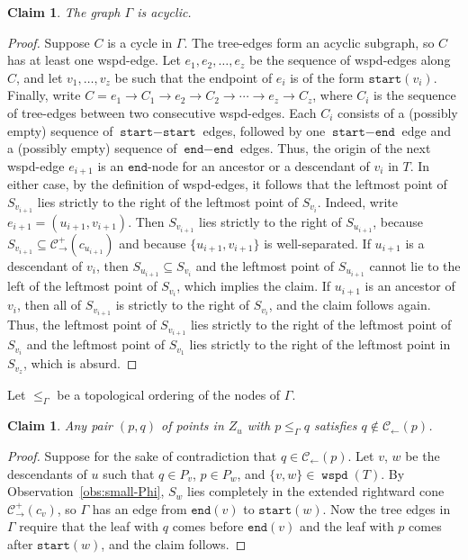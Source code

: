 \documentclass[11pt]{paper}
\DeclareMathOperator {\wspd}{\texttt{wspd}}
\newtheorem {claim}[theorem] {Claim}
\begin{document}
\begin{claim}\label{clm:acyclic}
The graph $\Gamma$ is acyclic.
\end {claim}

\begin{proof}
Suppose $C$ is a cycle in $\Gamma$.
The tree-edges form an acyclic subgraph, so $C$
has at least one wspd-edge. Let $e_1, e_2, \ldots, e_z$ be
the sequence of wspd-edges along $C$,
and let $v_1, \ldots, v_z$ be
such that the endpoint of $e_i$
is of the form $\texttt{start}(v_i)$.
Finally, write
$C = e_1 \rightarrow C_1 \rightarrow e_2 \rightarrow C_2 \rightarrow \cdots
\rightarrow e_z \rightarrow C_z$, where $C_i$ is the sequence of
tree-edges between two consecutive wspd-edges.
Each $C_i$ consists of a (possibly empty) sequence of
$\texttt{start}-\texttt{start}$
edges, followed by one $\texttt{start}-\texttt{end}$
edge and a (possibly empty) sequence of $\texttt{end}-\texttt{end}$ edges.
Thus, the origin of the next wspd-edge $e_{i+1}$ is
an $\texttt{end}$-node for an ancestor or a
descendant of $v_i$ in $T$. In either case, by the definition of wspd-edges,
it follows that the leftmost point of $S_{v_{i+1}}$ lies
strictly to the right of the leftmost point of $S_{v_i}$. 
Indeed, write $e_{i+1} = (u_{i+1}, v_{i+1})$. Then $S_{v_{i+1}}$
lies strictly to the right of $S_{u_{i+1}}$, because 
$S_{v_{i+1}} \subseteq \mathcal{C}_\rightarrow^{+}(c_{u_{i+1}})$
and because $\{u_{i+1}, v_{i+1}\}$ is well-separated.
If $u_{i+1}$ is a descendant of $v_i$, then 
$S_{u_{i+1}} \subseteq S_{v_i}$ and the leftmost
point of $S_{u_{i+1}}$ cannot lie to the left of the leftmost
point of $S_{v_i}$, which implies the claim. 
If $u_{i+1}$ is an ancestor of $v_i$, then all of $S_{v_{i+1}}$ is
strictly to the right of $S_{v_i}$, and the claim follows again.
Thus,
the leftmost point of $S_{v_{i+1}}$ lies strictly to the right of the leftmost
point of $S_{v_{i}}$ and the leftmost point of
$S_{v_1}$ lies strictly to the right of the leftmost point in
$S_{v_z}$, which is absurd.
\end {proof}

Let $\leq_{\Gamma}$ be a topological ordering
of the nodes of $\Gamma$.

\begin{claim} \label {clm:order}
Any pair $(p, q)$ of points in $Z_u$ with $p \leq_\Gamma q$ satisfies
$q \notin \mathcal{C}_\leftarrow(p)$.
\end {claim}

\begin {proof}\label{clm:respecting_order}
Suppose for the sake of contradiction that $q \in \mathcal{C}_\leftarrow(p)$.
Let $v$, $w$ be the descendants of $u$ such that
$q \in P_v$, $p \in P_w$, 
and $\{v,w\} \in \wspd(T)$.
By Observation~\ref{obs:small-Phi}, $S_w$ lies completely
in the extended rightward cone $\mathcal{C}_\rightarrow^+(c_v)$, so
$\Gamma$ has an edge from $\texttt{end}(v)$ to $\texttt{start}(w)$.
Now the tree edges in $\Gamma$
require that the leaf with $q$
comes before $\texttt{end}(v)$ and the leaf with $p$ comes after
$\texttt{start}(w)$, and the claim follows.
\end{proof}
\end{document}
